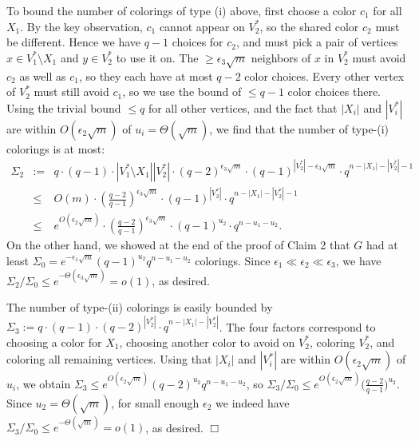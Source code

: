 \documentclass[11pt]{article}
\begin{document}
To bound the number of colorings of type (i) above, first choose a
color $c_1$ for all $X_1$.  By the key observation, $c_1$ cannot
appear on $V_2^*$, so the shared color $c_2$ must be different.  Hence
we have $q-1$ choices for $c_2$, and must pick a pair of vertices $x
\in V_1^* \setminus X_1$ and $y \in V_2^*$ to use it on.  The $\geq
\epsilon_3 \sqrt{m}$ neighbors of $x$ in $V_2^*$ must avoid $c_2$ as
well as $c_1$, so they each have at most $q-2$ color choices.  Every
other vertex of $V_2^*$ must still avoid $c_1$, so we use the bound of
$\leq q-1$ color choices there.  Using the trivial bound $\leq q$ for
all other vertices, and the fact that $|X_i|$ and $|V_i^*|$ are within
$O(\epsilon_2 \sqrt{m})$ of $u_i = \Theta(\sqrt{m})$, we find that the
number of type-(i) colorings is at most:
\begin{eqnarray*}
  \Sigma_2 &:=& q \cdot (q-1) \cdot |V_1^* \setminus X_1| |V_2^*| \cdot
  (q-2)^{\epsilon_3 \sqrt{m}} \cdot (q-1)^{|V_2^*| - \epsilon_3 \sqrt{m}} \cdot
  q^{n-|X_1|-|V_2^*|-1} \\
  &\leq& O(m) \cdot \left( \frac{q-2}{q-1} \right)^{\epsilon_3 \sqrt{m}} \cdot
  (q-1)^{|V_2^*|} \cdot q^{n-|X_1|-|V_2^*|-1} \\
  &\leq& e^{O(\epsilon_2 \sqrt{m})} \cdot \left( \frac{q-2}{q-1} \right)^{\epsilon_3 \sqrt{m}} \cdot
  (q-1)^{u_2} \cdot
  q^{n-u_1-u_2}.
\end{eqnarray*}
On the other hand, we showed at the end of the proof of Claim 2 that
$G$ had at least $\Sigma_0 = e^{-\epsilon_1 \sqrt{m}} (q-1)^{u_2}
q^{n-u_1-u_2}$ colorings.  Since $\epsilon_1 \ll \epsilon_2 \ll
\epsilon_3$, we have $\Sigma_2 / \Sigma_0 \leq e^{-\Theta(\epsilon_3
  \sqrt{m})} = o(1)$, as desired.

The number of type-(ii) colorings is easily bounded by $\Sigma_3 := q
\cdot (q-1) \cdot (q-2)^{|V_2^*|} \cdot q^{n-|X_1|-|V_2^*|}$.  The
four factors correspond to choosing a color for $X_1$, choosing
another color to avoid on $V_2^*$, coloring $V_2^*$, and coloring all
remaining vertices.  Using that $|X_i|$ and $|V_i^*|$ are within
$O(\epsilon_2 \sqrt{m})$ of $u_i$, we obtain $\Sigma_3 \leq
e^{O(\epsilon_2 \sqrt{m})} (q-2)^{u_2} q^{n-u_1-u_2}$, so $\Sigma_3 /
\Sigma_0 \leq e^{O(\epsilon_2 \sqrt{m})}
\big(\frac{q-2}{q-1}\big)^{u_2}$.  Since $u_2 = \Theta(\sqrt{m})$, for
small enough $\epsilon_2$ we indeed have $\Sigma_3 / \Sigma_0 \leq
e^{-\Theta(\sqrt{m})} = o(1)$, as desired.  \hfill $\Box$



\vspace{3mm}
\end{document}
